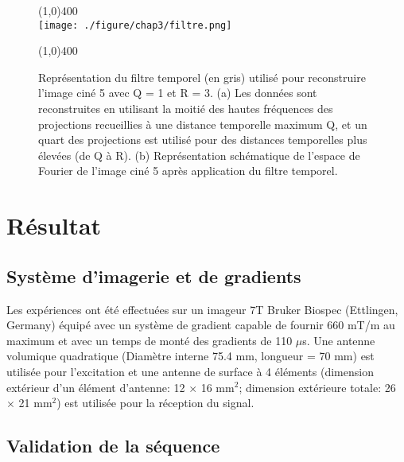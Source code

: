 \begin{figure}[H]
\centering \line(1,0){400} \\
\texttt{[image: ./figure/chap3/filtre.png]}
\caption[Filtre temporel]{\label{fig:filtre} Représentation du filtre temporel (en gris) utilisé pour reconstruire l'image ciné 5 avec Q = 1 et R = 3. (a) Les données sont reconstruites en utilisant la moitié des hautes fréquences des projections recueillies à une distance temporelle maximum Q, et un quart des projections est utilisé pour des distances temporelles plus élevées (de Q à R). (b) Représentation schématique de l'espace de Fourier de l'image ciné 5 après application du filtre temporel.}
\line(1,0){400} \\ \end{figure}

\section{Résultat}

\subsection{Système d'imagerie et de gradients}

Les expériences ont été effectuées sur un imageur 7T Bruker Biospec (Ettlingen, Germany) équipé avec un système de gradient capable de fournir 660 mT/m au maximum et avec un temps de monté des gradients de 110 $\mu$s.
Une antenne volumique quadratique (Diamètre interne 75.4 mm, longueur = 70 mm) est utilisée pour l'excitation et une antenne de surface à 4 éléments (dimension extérieur d'un élément d'antenne: 12 $\times$ 16 mm$ ^2$; dimension extérieure totale: 26 $\times$ 21 mm$ ^2$) est utilisée pour la réception du signal.

\subsection{Validation de la séquence}
